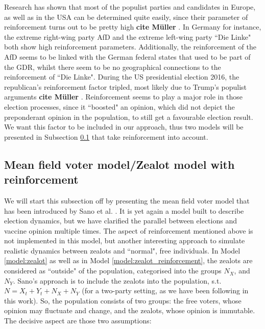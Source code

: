 \documentclass[12pt,a4paper,twoside]{article}
\begin{document}
Research has shown that most of the populist parties and candidates in Europe, as well as in the USA can be determined quite easily, since their parameter of reinforcement turns out to be pretty high \textbf{cite Müller}%
. In Germany for instance, the extreme right-wing party \ac{AfD} and the extreme left-wing party ``Die Linke" both show high reinforcement parameters. Additionally, the reinforcement of the \ac{AfD} seems to be linked with the German federal states that used to be part of the \ac{GDR}, whilst there seem to be no geographical connections to the reinforcement of ``Die Linke". During the US presidential election 2016, the republican's reinforcement factor tripled, most likely due to Trump's populist arguments \textbf{cite Müller}%
. Reinforcement seems to play a major role in those election processes, since it ``boosted" an opinion, which did not depict the preponderant opinion in the population, to still get a favourable election result. We want this factor to be included in our approach, thus two models will be presented in Subsection \ref{subsec:sano_zealot_reinforcement} that take reinforcement into account.\newline

\subsection{Mean field voter model/Zealot model with reinforcement}\label{subsec:sano_zealot_reinforcement}
We will start this subsection off by presenting the mean field voter model that has been introduced by Sano et al. \cite{Sano07122017}. It is yet again a model built to describe election dynamics, but we have clarified the parallel between elections and vaccine opinion multiple times. The aspect of reinforcement mentioned above is not implemented in this model, but another interesting approach to simulate realistic dynamics between zealots and ``normal", free individuals. In Model \ref{model:zealot} as well as in Model \ref{model:zealot_reinforcement}, the zealots are considered as ``outside" of the population, categorised into the groups $N_X$, and $N_Y$. Sano's approach is to include the zealots into the population, s.t. $N = X_t + Y_t + N_X + N_Y$ (for a two-party setting, as we have been following in this work). So, the population consists of two groups: the free voters, whose opinion may fluctuate and change, and the zealots, whose opinion is immutable. The decisive aspect are those two assumptions:
\end{document}
